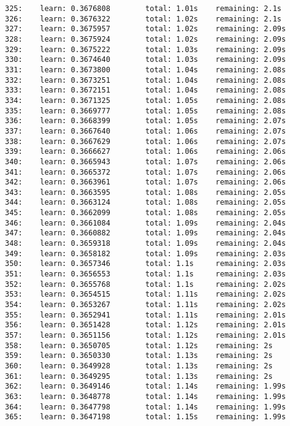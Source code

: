 \documentclass[11pt]{article}
\begin{document}
\begin{Verbatim}[commandchars=\\\{\}]
325:    learn: 0.3676808        total: 1.01s    remaining: 2.1s
326:    learn: 0.3676322        total: 1.02s    remaining: 2.1s
327:    learn: 0.3675957        total: 1.02s    remaining: 2.09s
328:    learn: 0.3675924        total: 1.02s    remaining: 2.09s
329:    learn: 0.3675222        total: 1.03s    remaining: 2.09s
330:    learn: 0.3674640        total: 1.03s    remaining: 2.09s
331:    learn: 0.3673800        total: 1.04s    remaining: 2.08s
332:    learn: 0.3673251        total: 1.04s    remaining: 2.08s
333:    learn: 0.3672151        total: 1.04s    remaining: 2.08s
334:    learn: 0.3671325        total: 1.05s    remaining: 2.08s
335:    learn: 0.3669777        total: 1.05s    remaining: 2.08s
336:    learn: 0.3668399        total: 1.05s    remaining: 2.07s
337:    learn: 0.3667640        total: 1.06s    remaining: 2.07s
338:    learn: 0.3667629        total: 1.06s    remaining: 2.07s
339:    learn: 0.3666627        total: 1.06s    remaining: 2.06s
340:    learn: 0.3665943        total: 1.07s    remaining: 2.06s
341:    learn: 0.3665372        total: 1.07s    remaining: 2.06s
342:    learn: 0.3663961        total: 1.07s    remaining: 2.06s
343:    learn: 0.3663595        total: 1.08s    remaining: 2.05s
344:    learn: 0.3663124        total: 1.08s    remaining: 2.05s
345:    learn: 0.3662099        total: 1.08s    remaining: 2.05s
346:    learn: 0.3661084        total: 1.09s    remaining: 2.04s
347:    learn: 0.3660882        total: 1.09s    remaining: 2.04s
348:    learn: 0.3659318        total: 1.09s    remaining: 2.04s
349:    learn: 0.3658182        total: 1.09s    remaining: 2.03s
350:    learn: 0.3657346        total: 1.1s     remaining: 2.03s
351:    learn: 0.3656553        total: 1.1s     remaining: 2.03s
352:    learn: 0.3655768        total: 1.1s     remaining: 2.02s
353:    learn: 0.3654515        total: 1.11s    remaining: 2.02s
354:    learn: 0.3653267        total: 1.11s    remaining: 2.02s
355:    learn: 0.3652941        total: 1.11s    remaining: 2.01s
356:    learn: 0.3651428        total: 1.12s    remaining: 2.01s
357:    learn: 0.3651156        total: 1.12s    remaining: 2.01s
358:    learn: 0.3650705        total: 1.12s    remaining: 2s
359:    learn: 0.3650330        total: 1.13s    remaining: 2s
360:    learn: 0.3649928        total: 1.13s    remaining: 2s
361:    learn: 0.3649295        total: 1.13s    remaining: 2s
362:    learn: 0.3649146        total: 1.14s    remaining: 1.99s
363:    learn: 0.3648778        total: 1.14s    remaining: 1.99s
364:    learn: 0.3647798        total: 1.14s    remaining: 1.99s
365:    learn: 0.3647198        total: 1.15s    remaining: 1.99s

\end{Verbatim}
\end{document}
